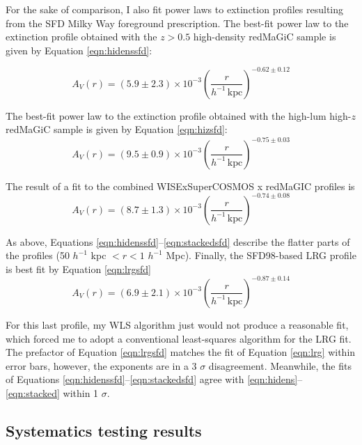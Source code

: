 \documentclass[11pt, oneside]{article}   	%
\newcommand{\hinv}{$h^{-1}$\xspace}
\begin{document}
For the sake of comparison, I also fit power laws to extinction profiles resulting from the SFD Milky Way foreground prescription. The best-fit power law to the extinction profile obtained with the $z > 0.5$ high-density redMaGiC sample is given by Equation \ref{eqn:hidenssfd}: 

\begin{equation}
A_V(r) = \left(5.9 \pm 2.3\right) \times 10^{-3} \left( \frac{r}{h^{-1}\, \mathrm{kpc}} \right)^{-0.62 \pm 0.12}\label{eqn:hidenssfd}
\end{equation}

The best-fit power law to the extinction profile obtained with the high-lum high-$z$ redMaGiC sample is given by Equation \ref{eqn:hizsfd}: 
\begin{equation}
A_V(r) = \left(9.5 \pm 0.9\right) \times 10^{-3} \left( \frac{r}{h^{-1}\, \mathrm{kpc}} \right)^{-0.75 \pm 0.03}\label{eqn:hizsfd}
\end{equation}

The result of a fit to the combined WISExSuperCOSMOS x redMaGIC profiles is
\begin{equation}
A_V(r) = \left(8.7 \pm 1.3\right) \times 10^{-3} \left( \frac{r}{h^{-1}\, \mathrm{kpc}} \right)^{-0.74 \pm 0.08}\label{eqn:stackedsfd}
\end{equation}

As above, Equations \ref{eqn:hidenssfd}--\ref{eqn:stackedsfd} describe the flatter parts of the profiles (50 \hinv kpc $ < r < 1$ \hinv Mpc). 
Finally, the SFD98-based LRG profile is best fit by Equation \ref{eqn:lrgsfd}
\begin{equation}
A_V(r) = \left(6.9 \pm 2.1\right) \times 10^{-3} \left( \frac{r}{h^{-1}\, \mathrm{kpc}} \right)^{-0.87 \pm 0.14}\label{eqn:lrgsfd}
\end{equation}

For this last profile, my WLS algorithm just would not produce a reasonable fit, which forced me to adopt a conventional least-squares algorithm for the LRG fit. The prefactor of Equation \ref{eqn:lrgsfd} matches the fit of Equation \ref{eqn:lrg} within error bars, however, the exponents are in a 3 $\sigma$ disagreement. Meanwhile, the fits of Equations \ref{eqn:hidenssfd}--\ref{eqn:stackedsfd} agree with \ref{eqn:hidens}--\ref{eqn:stacked} within 1 $\sigma$.



\subsection{Systematics testing results}\label{sec:systematics_results}
\end{document}
